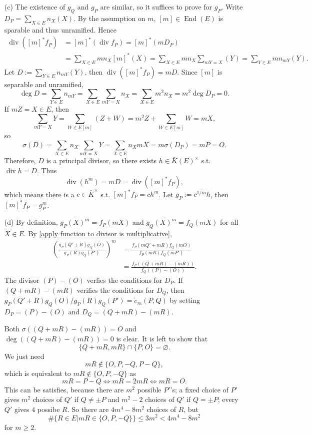 \documentclass{article}
\theoremstyle{definition}
\theoremstyle{remark}
\DeclareMathOperator{\enom}{End} %
\renewcommand{\div}{\mathop{\mathrm{div}}}
\begin{document}
\begin{enumerate}
\item [(c)]
The existence of $g_Q$ and $g_P$ are similar, so it suffices to prove for $g_P$.
Write $D_P = \sum_{X\in E}n_X(X)$.
By the assumption on $m$, $[m]\in\enom(E)$ is sparable and thus unramified. 
Hence\begin{align*}
    \div \left( [m]^* f_P\right) &= [m]^*(\div f_P) = [m]^*(mD_P)\\
    &=\sum_{X\in E} mn_X [m]^*(X) = \sum_{X\in E}mn_X\sum_{mY = X} (Y) = \sum_{Y\in E} mn_{mY}(Y).
\end{align*}
Let $D := \sum_{Y\in E}n_{mY}(Y)$, then $\div \left( [m]^* f_P\right) = mD$.
Since $[m]$ is separable and unramified, \[\deg D = \sum_{Y\in E}n_{mY} = \sum_{X\in E}\sum_{mY = X} n_X = \sum_{X\in E} m^2n_X = m^2\deg D_P = 0.\]
If $mZ = X\in E$, then \[\sum_{mY = X}Y = \sum_{W\in E[m]}(Z + W) = m^2Z + \sum_{W\in E[m]}W = mX,\] so
\[\sigma(D) = \sum_{X\in E}n_X\sum_{mY = X} Y = \sum_{X\in E}n_XmX = m\sigma(D_P) = mP = O.\]
Therefore, $D$ is a principal divisor, so there exists $h\in \bar{K}(E)^\times$ s.t. $\div h = D$.
Thus \[\div(h^m) = mD = \div([m]^*f_P),\] which means there is a $c\in \bar{K}^\times$ s.t. $[m]^*f_P = ch^m$.
Let $g_P := c^{1/m}h$, then $[m]^*f_P = g_P^m$.
\item [(d)]
By definition, $g_P(X)^m = f_P(mX)$ and $g_Q(X)^m = f_Q(mX)$ for all $X\in E$.
By \cref{apply function to divisor is multiplicative},
\begin{align*}
    \left( \frac{g_P(Q' + R)g_Q(O)}{g_P(R)g_Q(P')} \right)^m
    &= \frac{f_P(mQ'+mR)f_Q(mO)}{f_P(mR)f_Q(mP')}\\
    &= \frac{f_P((Q + mR) - (mR))}{f_Q((P) - (O))}. 
\end{align*}
The divisor $(P) - (O)$ verfies the conditions for $D_P$.
If $(Q + mR) - (mR)$ verifies the conditions for $D_Q$, then $g_P(Q' + R)g_Q(O)/g_P(R)g_Q(P') = \tilde{e}_m(P, Q)$ by setting $D_P = (P) - (O)$ and $D_Q = (Q+mR) - (mR)$.

Both $\sigma((Q + mR) - (mR)) = O$ and $\deg((Q + mR) - (mR)) = 0$ is clear. It is left to show that \begin{equation}\label{disjoint condition}
    \{Q + mR, mR\}\cap \{P, O\} = \varnothing.
\end{equation}
We just need \[mR\notin\{O, P, -Q, P - Q\},\]
which is equivalent to $mR\notin\{O, P, -Q\}$
as \[mR = P - Q\iff mR = 2mR \iff mR = O.\]
This can be satisfies, because there are $m^2$ possible $P'$'s; a fixed choice of $P'$ gives $m^2$ choices of $Q'$ if $Q\ne \pm P$ and $m^2 - 2$ choices of $Q'$ if $Q = \pm P$; every $Q'$ gives $4$ possibe $R$.
So there are $4m^4 - 8m^2$ choices of $R$, but \[\#\{R\in E | mR\in\{O, P, -Q\}\} \le 3m^2 < 4m^4 - 8m^2\]
for $m\ge 2$.


\end{enumerate}
\end{document}
